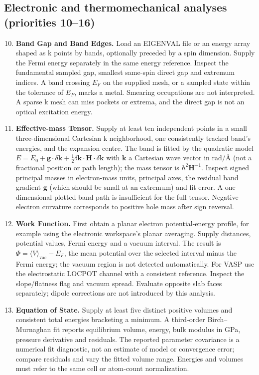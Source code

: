 \subsection{Electronic and thermomechanical analyses (priorities 10--16)}
\begin{enumerate}\setcounter{enumi}{9}
\item \textbf{Band Gap and Band Edges.} Load an EIGENVAL file or an energy array shaped as k points by bands, optionally preceded by a spin dimension. Supply the Fermi energy separately in the same energy reference. Inspect the fundamental sampled gap, smallest same-spin direct gap and extremum indices. A band crossing $E_F$ on the supplied mesh, or a sampled state within the tolerance of $E_F$, marks a metal. Smearing occupations are not interpreted. A sparse k mesh can miss pockets or extrema, and the direct gap is not an optical excitation energy.
\item \textbf{Effective-mass Tensor.} Supply at least ten independent points in a small three-dimensional Cartesian k neighborhood, one consistently tracked band's energies, and the expansion centre. The band is fitted by the quadratic model $E=E_0+\mathbf g\cdot\delta\mathbf k+\tfrac12\delta\mathbf k\cdot\mathbf H\cdot\delta\mathbf k$ with $\mathbf k$ a Cartesian wave vector in rad/\AA{} (not a fractional position or path length); the mass tensor is $\hbar^2\mathbf H^{-1}$. Inspect signed principal masses in electron-mass units, principal axes, the residual band gradient $\mathbf g$ (which should be small at an extremum) and fit error. A one-dimensional plotted band path is insufficient for the full tensor. Negative electron curvature corresponds to positive hole mass after sign reversal.
\item \textbf{Work Function.} First obtain a planar electron potential-energy profile, for example using the electronic workspace's planar averaging. Supply distances, potential values, Fermi energy and a vacuum interval. The result is $\Phi=\langle V\rangle_{\mathrm{vac}}-E_F$, the mean potential over the selected interval minus the Fermi energy; the vacuum region is not detected automatically. For VASP use the electrostatic LOCPOT channel with a consistent reference. Inspect the slope/flatness flag and vacuum spread. Evaluate opposite slab faces separately; dipole corrections are not introduced by this analysis.
\item \textbf{Equation of State.} Supply at least five distinct positive volumes and consistent total energies bracketing a minimum. A third-order Birch--Murnaghan fit reports equilibrium volume, energy, bulk modulus in GPa, pressure derivative and residuals. The reported parameter covariance is a numerical fit diagnostic, not an estimate of model or convergence error; compare residuals and vary the fitted volume range. Energies and volumes must refer to the same cell or atom-count normalization.

\end{enumerate}
